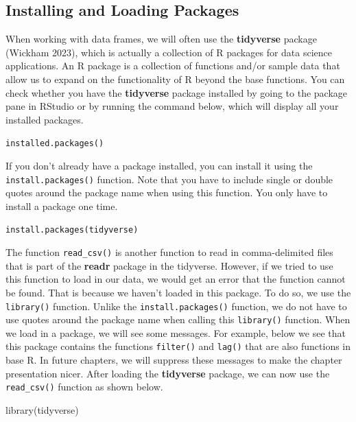\documentclass[
  letterpaper,
]{krantz}
\makeatletter
\newenvironment{Shaded}{\begin{snugshade}}{\end{snugshade}}
\newcommand{\FunctionTok}[1]{\textcolor[rgb]{0.28,0.35,0.67}{#1}}
\newcommand{\NormalTok}[1]{\textcolor[rgb]{0.00,0.23,0.31}{#1}}
\newenvironment{kframe}{%
\medskip{}
\setlength{\fboxsep}{.8em}
 \def\at@end@of@kframe{}%
 \ifinner\ifhmode%
  \def\at@end@of@kframe{\end{minipage}}%
  \begin{minipage}{\columnwidth}%
 \fi\fi%
 \def\FrameCommand##1{\hskip\@totalleftmargin \hskip-\fboxsep
 \colorbox{shadecolor}{##1}\hskip-\fboxsep
     \hskip-\linewidth \hskip-\@totalleftmargin \hskip\columnwidth}%
 \MakeFramed {\advance\hsize-\width
   \@totalleftmargin\z@ \linewidth\hsize
   \@setminipage}}%
 {\par\unskip\endMakeFramed%
 \at@end@of@kframe}
\renewenvironment{Shaded}{\begin{kframe}}{\end{kframe}}
\makeatother
\begin{document}
\hypertarget{installing-and-loading-packages}{%
\subsection{Installing and Loading
Packages}\label{installing-and-loading-packages}}

When working with data frames, we will often use the \textbf{tidyverse}
package (Wickham 2023), which is actually a collection of R packages for
data science applications. An R package is a collection of functions
and/or sample data that allow us to expand on the functionality of R
beyond the base functions. You can check whether you have the
\textbf{tidyverse} package installed by going to the package pane in
RStudio or by running the command below, which will display all your
installed packages.

\texttt{installed.packages()}

If you don't already have a package installed, you can install it using
the \texttt{install.packages()} function. Note that you have to include
single or double quotes around the package name when using this
function. You only have to install a package one time.

\texttt{install.packages(\textquotesingle{}tidyverse\textquotesingle{})}

The function \texttt{read\_csv()} is another function to read in
comma-delimited files that is part of the \textbf{readr} package in the
tidyverse. However, if we tried to use this function to load in our
data, we would get an error that the function cannot be found. That is
because we haven't loaded in this package. To do so, we use the
\texttt{library()} function. Unlike the \texttt{install.packages()}
function, we do not have to use quotes around the package name when
calling this \texttt{library()} function. When we load in a package, we
will see some messages. For example, below we see that this package
contains the functions \texttt{filter()} and \texttt{lag()} that are
also functions in base R. In future chapters, we will suppress these
messages to make the chapter presentation nicer. After loading the
\textbf{tidyverse} package, we can now use the \texttt{read\_csv()}
function as shown below.

\begin{Shaded}
\begin{Highlighting}[]
\FunctionTok{library}\NormalTok{(tidyverse)}
\end{Highlighting}
\end{Shaded}
\end{document}
